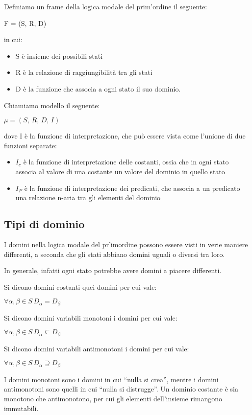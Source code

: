 Definiamo un frame della logica modale del prim'ordine il seguente:

F = (S, R, D)

in cui:
\begin{itemize}
\item S è insieme dei possibili stati
\item R è la relazione di raggiungibilità tra gli stati
\item D è la funzione che associa a ogni stato il suo dominio.
\end{itemize}
Chiamiamo modello il seguente:

$\mu=(S,\, R,\, D,\, I)$

dove I è la funzione di interpretazione, che può essere vista come
l'unione di due funzioni separate:
\begin{itemize}
\item $I_{c}$ è la funzione di interpretazione delle costanti, ossia che
in ogni stato associa al valore di una costante un valore del dominio
in quello stato
\item $I_{P}$ è la funzione di interpretazione dei predicati, che associa
a un predicato una relazione n-aria tra gli elementi del dominio
\end{itemize}

\subsection{Tipi di dominio}

I domini nella logica modale del pr'imordine possono essere visti
in verie maniere differenti, a seconda che gli stati abbiano domini
uguali o diversi tra loro.

In generale, infatti ogni stato potrebbe avere domini a piacere differenti.

Si dicono domini costanti quei domini per cui vale:

$\forall\alpha,\beta\in S\, D_{\alpha}=D_{\beta}$

Si dicono domini variabili monotoni i domini per cui vale:

$\forall\alpha,\beta\in S\, D_{\alpha}\subseteq D_{\beta}$

Si dicono domini variabili antimonotoni i domini per cui vale:

$\forall\alpha,\beta\in S\, D_{\alpha}\supseteq D_{\beta}$

I domini monotoni sono i domini in cui ``nulla si crea'', mentre
i domini antimonotoni sono quelli in cui ``nulla si distrugge''.
Un dominio costante è sia monotono che antimonotono, per cui gli elementi
dell'insieme rimangono immutabili.

